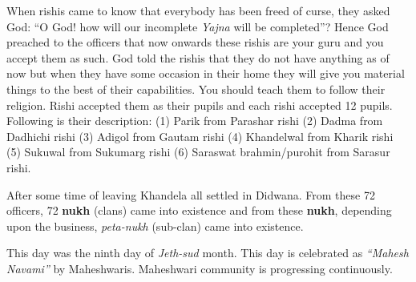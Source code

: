 When rishis came to know that everybody has been freed of curse, they asked
God: ``O God! how will our incomplete \textit{Yajna} will be completed''? Hence God
preached to the officers that now onwards these rishis are your guru and you
accept them as such. God told the rishis that they do not have anything as of
now but when they have some occasion in their home they will give you material
things to the best of their capabilities. You should teach them to follow their
religion. Rishi accepted them as their pupils and each rishi accepted 12
pupils. Following is their description: (1) Parik from Parashar rishi (2) Dadma
from Dadhichi rishi (3) Adigol from Gautam rishi (4) Khandelwal from Kharik
rishi (5) Sukuwal from Sukumarg rishi (6) Saraswat brahmin/purohit from Sarasur
rishi.

After some time of leaving Khandela all settled in Didwana. From these 72
officers, 72 \textbf{nukh} (clans) came into existence and from these
\textbf{nukh}, depending upon the business, \textit{peta-nukh} (sub-clan) came
into existence.

This day was the ninth day of \textit{Jeth-sud} month. This day is celebrated
as \textit{``Mahesh Navami''} by Maheshwaris. Maheshwari community is
progressing continuously.
